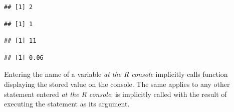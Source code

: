 \documentclass[krantz2]{krantz}\usepackage{knitr}
\begin{document}
\begin{knitrout}\footnotesize
{}\color{fgcolor}\begin{kframe}
\begin{alltt}
 \hlkwb{<-} 
 \hlopt{+} 
\end{alltt}
\begin{verbatim}
## [1] 2
\end{verbatim}
\begin{alltt}
\end{alltt}
\begin{verbatim}
## [1] 1
\end{verbatim}
\begin{alltt}
 \hlkwb{<-} 
 \hlkwb{<-}  \hlopt{+} 
\end{alltt}
\begin{verbatim}
## [1] 11
\end{verbatim}
\begin{alltt}
 \hlopt{*} 
\end{alltt}
\begin{verbatim}
## [1] 0.06
\end{verbatim}
\end{kframe}
\end{knitrout}

Entering the name of a variable \emph{at the R console} implicitly calls function  displaying the stored value on the console. The same applies to any other statement entered \emph{at the R console}:  is implicitly called with the result of executing the statement as its argument.
\end{document}
